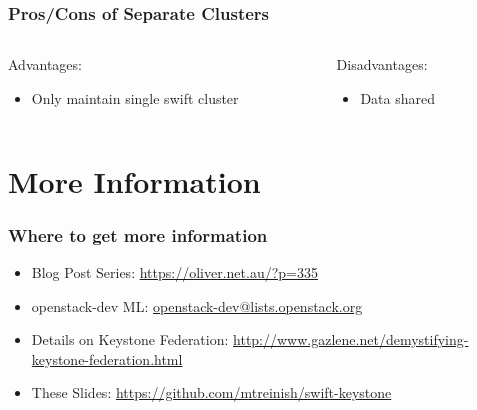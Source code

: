 \documentclass[aspectratio=169,11pt,hyperref={colorlinks=true}]{beamer}
\begin{document}
\begin{frame}
\frametitle{Pros/Cons of Separate Clusters}
\begin{columns}[T]
    \begin{column}{.48\textwidth}
        Advantages:
        \begin{itemize}
            \item Only maintain single swift cluster
        \end{itemize}
    \end{column}
    \begin{column}{.48\textwidth}
        Disadvantages:
        \begin{itemize}
            \item Data shared
        \end{itemize}
    \end{column}
\end{columns}
\end{frame}

\section{More Information}
\begin{frame}
\frametitle{Where to get more information}
    \begin{itemize}
        \item Blog Post Series: \href{https://oliver.net.au/?p=335}{https://oliver.net.au/?p=335}
        \item openstack-dev ML: \href{mailto:openstack-dev@lists.openstack.org}{openstack-dev@lists.openstack.org}
        \item Details on Keystone Federation: \href{http://www.gazlene.net/demystifying-keystone-federation.html}{http://www.gazlene.net/demystifying-keystone-federation.html}
        \item These Slides: \href{https://github.com/mtreinish/swift-keystone}{https://github.com/mtreinish/swift-keystone}
   \end{itemize}
\end{frame}
\end{document}
